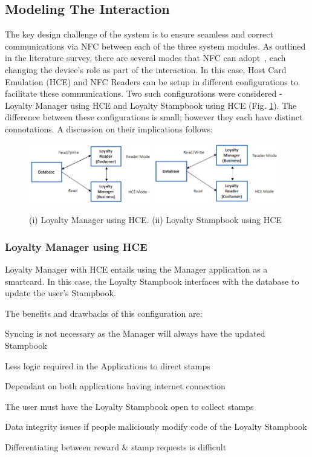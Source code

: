 \subsection{Modeling The Interaction}
The key design challenge of the system is to ensure seamless and correct communications via NFC between each of the three system modules. As outlined in the literature survey, there are several modes that NFC can adopt~\cite{4278549}, each changing the device's role as part of the interaction. In this case, Host Card Emulation (HCE) and NFC Readers can be setup in different configurations to facilitate these communications. Two such configurations were considered - Loyalty Manager using HCE and Loyalty Stampbook using HCE (Fig. \ref{fig:dArches}). The difference between these configurations is small; however they each have distinct connotations. A discussion on their implications follows:

\begin{figure}[H]
 \centering
  \includegraphics[width=0.48\textwidth]{img/dArch1.png}
   \includegraphics[width=0.48\textwidth]{img/dArch2.png}
    \caption{(i) Loyalty Manager using HCE. (ii) Loyalty Stampbook using HCE}
     \label{fig:dArches}
\end{figure}

\subsubsection{Loyalty Manager using HCE}
Loyalty Manager with HCE entails using the Manager application as a smartcard. In this case, the Loyalty Stampbook interfaces with the database to update the user's Stampbook. 

The benefits and drawbacks of this configuration are: 
\begin{description}[leftmargin=!,labelwidth=\widthof{\bfseries small}]
    \item[+] Syncing is not necessary as the Manager will always have the updated Stampbook
    \item[+] Less logic required in the Applications to direct stamps
    \item[---] Dependant on both applications having internet connection
    \item[---] The user must have the Loyalty Stampbook open to collect stamps
    \item[---] Data integrity issues if people maliciously modify code of the Loyalty Stampbook 
    \item[---] Differentiating between  reward \& stamp requests is difficult
\end{description}
